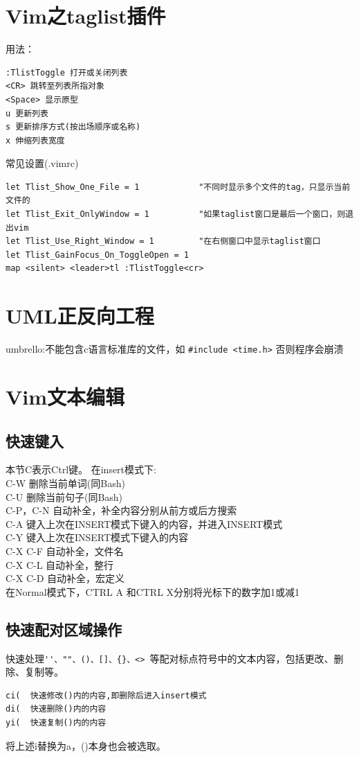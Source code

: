 \section{Vim之taglist插件}
用法：
\begin{verbatim}
:TlistToggle 打开或关闭列表
<CR> 跳转至列表所指对象
<Space> 显示原型
u 更新列表
s 更新排序方式(按出场顺序或名称)
x 伸缩列表宽度
\end{verbatim}

常见设置(.vimrc)
\begin{verbatim}
let Tlist_Show_One_File = 1            "不同时显示多个文件的tag，只显示当前文件的
let Tlist_Exit_OnlyWindow = 1          "如果taglist窗口是最后一个窗口，则退出vim
let Tlist_Use_Right_Window = 1         "在右侧窗口中显示taglist窗口
let Tlist_GainFocus_On_ToggleOpen = 1
map <silent> <leader>tl :TlistToggle<cr>
\end{verbatim}


\section{UML正反向工程}
umbrello:不能包含c语言标准库的文件，如
\verb+#include <time.h>+
否则程序会崩溃
\section{Vim文本编辑}


\subsection{快速键入}
本节C表示Ctrl键。
在insert模式下:\\
C-W 删除当前单词(同Bash) \\
C-U 删除当前句子(同Bash)\\
C-P，C-N  自动补全，补全内容分别从前方或后方搜索\\
C-A 键入上次在INSERT模式下键入的内容，并进入INSERT模式\\
C-Y 键入上次在INSERT模式下键入的内容\\
C-X C-F 自动补全，文件名\\
C-X C-L 自动补全，整行\\
C-X C-D  自动补全，宏定义\\

在Normal模式下，CTRL A 和CTRL X分别将光标下的数字加1或减1

\subsection{快速配对区域操作}
快速处理\verb+''、""、()、[]、{}、<> +等配对标点符号中的文本内容，包括更改、删除、复制等。
\begin{verbatim}
ci(  快速修改()内的内容,即删除后进入insert模式
di(  快速删除()内的内容
yi(  快速复制()内的内容
\end{verbatim}
将上述i替换为a，()本身也会被选取。


